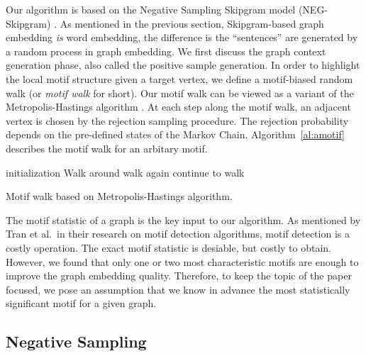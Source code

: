 \documentclass[letterpaper]{article}
\begin{document}
            Our algorithm is based on the Negative Sampling Skipgram model (NEG-Skipgram) \cite{skipgram}.
            As mentioned in the previous section, Skipgram-based graph embedding \emph{is} word embedding,
            the difference is the ``sentences'' are generated by a random process in graph embedding.
            We first discuss the graph context generation phase, also called the positive sample generation.
            In order to highlight the local motif structure given a target vertex, we define a motif-biased
            random walk (or \emph{motif walk} for short). Our motif walk can be viewed as a variant of
            the Metropolis-Hastings algorithm \cite{mh}. At each step along 
            the motif walk, an adjacent vertex is chosen by the rejection sampling procedure. The rejection
            probability depends on the pre-defined states of the Markov Chain. Algorithm~\ref{al:amotif} 
            describes the motif walk for an arbitary motif.

            \begin{algorithm}
                \DontPrintSemicolon
                initialization\;
                 {
                    Walk around\;
                     {
                        walk again\;
                    } {
                        continue to walk\;
                    }
                }
                \caption{Motif walk based on Metropolis-Hastings algorithm.}
                \label{al:amotif}
            \end{algorithm}

            The motif statistic of a graph is the key input to our algorithm. As mentioned by Tran et al.\ in
            their research on motif detection algorithms, motif detection is a costly operation. The
            exact motif statistic is desiable, but costly to obtain. However, we found that only one or 
            two most characteristic motifs are enough to improve the graph embedding quality. Therefore, 
            to keep the topic of the paper focused, we pose an assumption that we know in advance the most
            statistically significant motif for a given graph. 

        \subsection{Negative Sampling}
\end{document}
